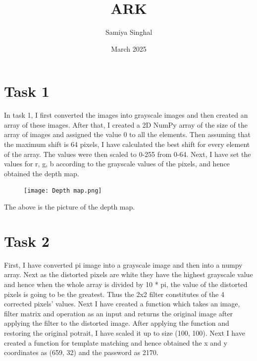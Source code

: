 \documentclass{article}
\title{ARK}
\author{Samiya Singhal}
\date{March 2025}
\begin{document}
\maketitle

\section{Task 1}
In task 1, I first converted the images into grayscale images and then created an array of these images.  After that, I created a 2D NumPy array of the size of the array of images and assigned the value 0 to all the elements. Then assuming that the maximum shift is 64 pixels, I have calculated the best shift for every element of the array.  The values were then scaled to 0-255 from 0-64. Next, I have set the values for r, g, b according to the grayscale values of the pixels, and hence obtained the depth map.
\begin{figure}[h!]
    \centering
    \texttt{[image: Depth map.png]}
\end{figure}

The above is the picture of the depth map.

\section{Task 2}
First, I have converted pi image into a grayscale image and then into a numpy array. Next as the distorted pixels are white they have the highest grayscale value and hence when the whole array is divided by 10 * pi, the value of the distorted pixels is going to be the greatest. Thus the 2x2 filter constitutes of the 4 corrected pixels' values.  Next I have created a function which takes an image, filter matrix and operation as an input and returns the original image after applying the filter to the distorted image. After applying the function and restoring the original potrait, I have scaled it up to size (100, 100). Next I have created a function for template matching and hence obtained the x and y coordinates as (659, 32) and the password as 2170.
\end{document}
